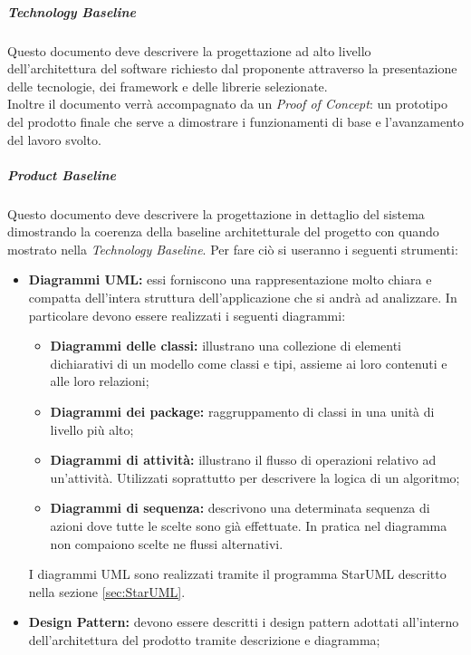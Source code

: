		
			\subparagraph{Technology Baseline}
			\Spazio
			Questo documento deve descrivere la progettazione ad alto livello dell'architettura del software richiesto dal proponente attraverso la presentazione delle tecnologie, dei framework e delle librerie selezionate. \\
			Inoltre il documento verrà accompagnato da un \textit{Proof of Concept}: un prototipo del prodotto finale che serve a dimostrare i funzionamenti di base e l'avanzamento del lavoro svolto. 

			\subparagraph{Product Baseline}
			\Spazio
			Questo documento deve descrivere la progettazione in dettaglio del sistema dimostrando la coerenza della baseline architetturale del progetto con quando mostrato nella \textit{Technology Baseline}.
			Per fare ciò si useranno i seguenti strumenti:
				\begin{itemize}
					\item \textbf{Diagrammi UML:}
					essi forniscono una rappresentazione molto chiara e compatta dell'intera struttura dell'applicazione che si andrà ad analizzare. In particolare devono essere realizzati i seguenti diagrammi:
					\begin{itemize}
						\item \textbf{Diagrammi delle classi:} illustrano una collezione di elementi dichiarativi di un modello come classi e tipi, assieme ai loro contenuti e alle loro relazioni;
						\item \textbf{Diagrammi dei package:}  raggruppamento di classi in una unità di livello più alto;
						\item \textbf{Diagrammi di attività:} illustrano il flusso di operazioni relativo ad un'attività. Utilizzati soprattutto per descrivere la logica di un algoritmo;
						\item \textbf{Diagrammi di sequenza:} descrivono una determinata sequenza di azioni dove tutte le scelte sono già effettuate. In pratica nel diagramma non compaiono scelte ne flussi alternativi.
					\end{itemize}
					I diagrammi UML sono realizzati tramite il programma StarUML descritto nella sezione \ref{sec:StarUML}.
					\item \textbf{Design Pattern:}
					devono essere descritti i design pattern adottati all'interno dell'architettura del prodotto tramite descrizione e diagramma;
				\end{itemize}
			
